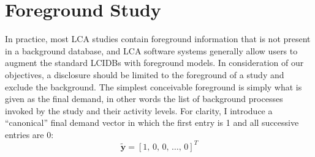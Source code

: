 \section{Foreground Study}

In practice, most LCA studies contain foreground information that is not present in a background database, and LCA software systems generally allow users to augment the standard LCIDBs with foreground models.  In consideration of our objectives, a disclosure should be limited to the foreground of a study and exclude the background.  The simplest conceivable foreground is simply what is given as the final demand, in other words the list of background processes invoked by the study and their activity levels.  For clarity, I introduce a ``canonical'' final demand vector in which the first entry is 1 and all successive entries are 0:
\begin{equation}
\tilde{\mathbf{y}} =  [ 1,\, 0,\, 0 ,\,\ldots,\, 0]^{T}
\label{eqn:canonical_y}
\end{equation}
